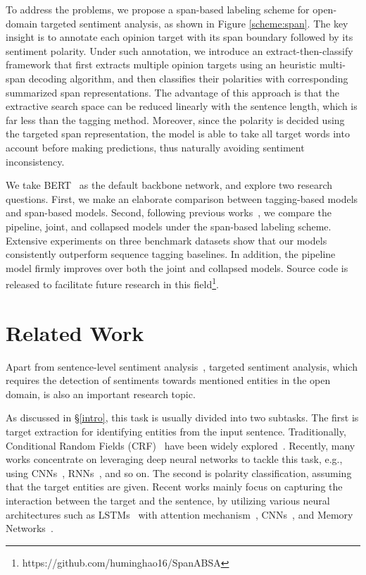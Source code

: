 \documentclass[11pt,a4paper]{article}
\begin{document}
To address the problems, we propose a span-based labeling scheme for open-domain targeted sentiment analysis, as shown in Figure \ref{scheme:span}.
The key insight is to annotate each opinion target with its span boundary followed by its sentiment polarity.
Under such annotation, we introduce an extract-then-classify framework that first extracts multiple opinion targets using an heuristic multi-span decoding algorithm, and then classifies their polarities with corresponding summarized span representations.
The advantage of this approach is that the extractive search space can be reduced linearly with the sentence length, which is far less than the tagging method.
Moreover, since the polarity is decided using the targeted span representation, the model is able to take all target words into account before making predictions, thus naturally avoiding sentiment inconsistency.

We take BERT~\cite{devlin2018bert} as the default backbone network, and explore two research questions.
First, we make an elaborate comparison between tagging-based models and span-based models.
Second, following previous works~\cite{mitchell2013open,zhang2015neural}, we compare the pipeline, joint, and collapsed models under the span-based labeling scheme.
Extensive experiments on three benchmark datasets show that our models consistently outperform sequence tagging baselines.
In addition, the pipeline model firmly improves over both the joint and collapsed models.
Source code is released to facilitate future research in this field\footnote{https://github.com/huminghao16/SpanABSA}. \section{Related Work}
Apart from sentence-level sentiment analysis~\cite{lin2009joint,kim2014convolutional}, targeted sentiment analysis, which requires the detection of sentiments towards mentioned entities in the open domain, is also an important research topic.

As discussed in \S\ref{intro}, this task is usually divided into two subtasks.
The first is target extraction for identifying entities from the input sentence.
Traditionally, Conditional Random Fields (CRF)~\cite{lafferty2001conditional} have been widely explored~\cite{jakob2010extracting,wang2016recursive,shu2017lifelong}.
Recently, many works concentrate on leveraging deep neural networks to tackle this task, e.g., using CNNs~\cite{poria2016aspect,xu2018double}, RNNs~\cite{liu2015fine,he2017unsupervised}, and so on.
The second is polarity classification, assuming that the target entities are given.
Recent works mainly focus on capturing the interaction between the target and the sentence, by utilizing various neural architectures such as LSTMs~\cite{hochreiter1997long,tang2015effective} with attention mechanism~\cite{wang2016attention,li2018transformation,fan2018multi}, CNNs~\cite{xue2018aspect,huang2018parameterized}, and Memory Networks~\cite{tang2016aspect,chen2017recurrent,li2017deep}.
\end{document}
